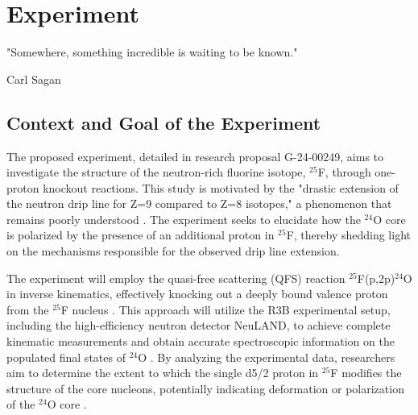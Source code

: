 
%

\makeatletter
\newcommand{\ntifpkgloaded}{%
  \@ifpackageloaded%
}
\makeatother


\chapter{Experiment}
\label{cha:experiment}

\epigraph{
	"Somewhere, something incredible is waiting to be known."
}{Carl Sagan}



\section{Context and Goal of the Experiment} %
\label{sec:contex_goal_experiment}

The proposed experiment, detailed in research proposal G-24-00249, aims to investigate the structure of the neutron-rich fluorine isotope, $^{25}$F, through one-proton knockout reactions. This study is motivated by the "drastic extension of the neutron drip line for Z=9 compared to Z=8 isotopes," a phenomenon that remains poorly understood \cite{ahn_location_2019}. The experiment seeks to elucidate how the $^{24}$O core is polarized by the presence of an additional proton in $^{25}$F, thereby shedding light on the mechanisms responsible for the observed drip line extension.

The experiment will employ the quasi-free scattering (\gls{QFS}) reaction $^{25}$F(p,2p)$^{24}$O in inverse kinematics, effectively knocking out a deeply bound valence proton from the $^{25}$F nucleus \cite{panin_exclusive_2016}. This approach will utilize the R3B experimental setup, including the high-efficiency neutron detector NeuLAND, to achieve complete kinematic measurements and obtain accurate spectroscopic information on the populated final states of $^{24}$O \cite{boretzky_neuland_2021}. By analyzing the experimental data, researchers aim to determine the extent to which the single d5/2 proton in $^{25}$F modifies the structure of the core nucleons, potentially indicating deformation or polarization of the $^{24}$O core \cite{macchiavelli_core_2020}.

